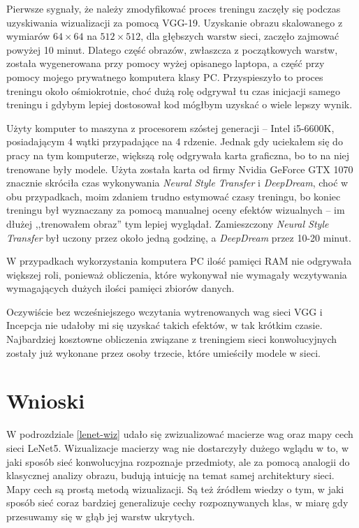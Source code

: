 Pierwsze sygnały, że należy zmodyfikować proces treningu zaczęły się podczas uzyskiwania wizualizacji za pomocą VGG-19.
Uzyskanie obrazu skalowanego z wymiarów \(64 \times 64\) na \(512 \times 512\), dla głębszych warstw sieci, zaczęło zajmować powyżej 10 minut.
Dlatego część obrazów, zwłaszcza z początkowych warstw, została wygenerowana przy pomocy wyżej opisanego laptopa, a część przy pomocy mojego prywatnego komputera klasy PC. Przyspieszyło to proces treningu około ośmiokrotnie, choć dużą rolę odgrywał tu czas inicjacji samego treningu i gdybym lepiej dostosował kod mógłbym uzyskać o wiele lepszy wynik.

Użyty komputer to maszyna z procesorem szóstej generacji -- Intel i5-6600K, posiadającym 4 wątki przypadające na 4 rdzenie. Jednak gdy uciekałem się do pracy na tym komputerze, większą rolę odgrywała karta graficzna, bo to na niej trenowane były modele. Użyta została karta od firmy Nvidia GeForce GTX 1070 znacznie skróciła czas wykonywania \textit{Neural Style Transfer} i \textit{DeepDream}, choć w obu przypadkach, moim zdaniem trudno estymować czasy treningu, bo koniec treningu był wyznaczany za pomocą
manualnej oceny efektów wizualnych -- im dłużej ,,trenowałem obraz'' tym lepiej wyglądał. Zamieszczony \textit{Neural Style Transfer} był uczony przez około jedną godzinę, a \textit{DeepDream} przez 10-20 minut.

W przypadkach wykorzystania komputera PC ilość pamięci RAM nie odgrywała większej roli, ponieważ obliczenia, które wykonywał nie wymagały wczytywania wymagających dużych ilości pamięci zbiorów danych.

Oczywiście bez wcześniejszego wczytania wytrenowanych wag sieci VGG i Incepcja nie udałoby mi się uzyskać takich efektów, w tak krótkim czasie. Najbardziej kosztowne obliczenia związane z treningiem sieci konwolucyjnych zostały już wykonane przez osoby trzecie, które umieściły modele w sieci.

\section{Wnioski}
W podrozdziale \ref{lenet-wiz} udało się zwizualizować macierze wag oraz mapy cech sieci LeNet5. Wizualizacje macierzy wag nie dostarczyły dużego wglądu w to, w jaki sposób sieć konwolucyjna rozpoznaje przedmioty, ale za pomocą analogii do klasycznej analizy obrazu, budują intuicję na temat samej architektury sieci. Mapy cech są prostą metodą wizualizacji. Są też źródłem wiedzy o tym, w jaki sposób sieć coraz bardziej generalizuje cechy rozpoznywanych klas, w miarę gdy przesuwamy się
w głąb jej warstw ukrytych.  


